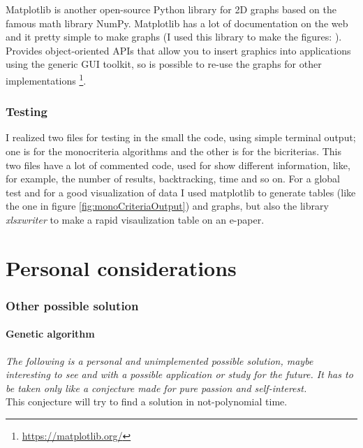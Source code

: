 \documentclass[a4paper,11pt]{report}
\begin{document}
Matplotlib is another open-source Python library for 2D graphs based on the famous math library NumPy. Matplotlib has a lot of documentation on the web and it pretty simple to make graphs (I used this library to make the figures: ).
Provides object-oriented APIs that allow you to insert graphics into applications using the generic GUI toolkit, so is possible to re-use the graphs for other implementations \footnote{\url{https://matplotlib.org/}}.
\subsection{Testing}
I realized two files for testing in the small the code, using simple terminal output; one is for the monocriteria algorithms and the other is for the bicriterias. This two files have a lot of commented code, used for show different information, like, for example, the number of results, backtracking, time and so on. For a global test and for a good visualization of data I used matplotlib to generate tables (like the one in figure \ref{fig:monoCriteriaOutput}) and graphs, but also the library \textit{xlsxwriter} to make a rapid visaulization table on an e-paper.
\chapter{Personal considerations}
\subsection{Other possible solution}
\subsubsection*{Genetic algorithm}
\textit{The following is a personal and unimplemented possible solution, maybe interesting to see and with a possible application or study for the future.
It has to be taken only like a conjecture made for pure passion and self-interest.}
\vspace{10mm}\\
This conjecture will try to find a solution in not-polynomial time.
\end{document}
